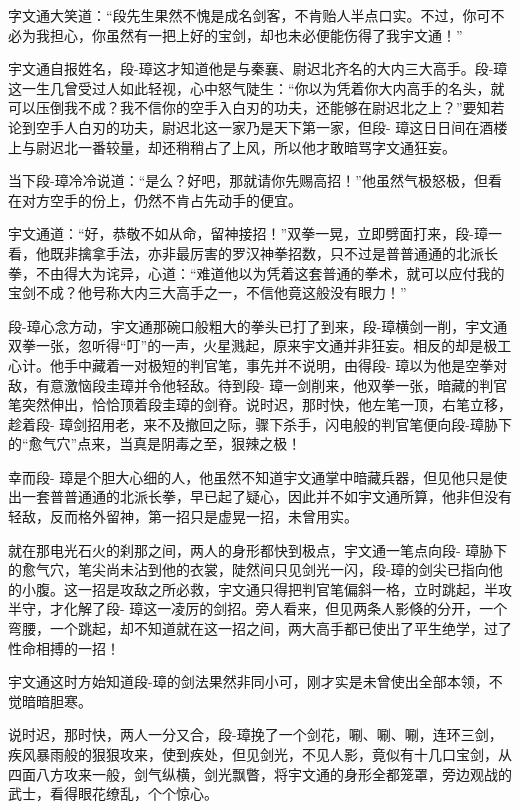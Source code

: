 \documentclass[12pt,oneside]{book}
\begin{document}
字文通大笑道：``段先生果然不愧是成名剑客，不肯贻人半点口实。不过，你可不必为我担心，你虽然有一把上好的宝剑，却也未必便能伤得了我宇文通！''

宇文通自报姓名，段-璋这才知道他是与秦襄、尉迟北齐名的大内三大高手。段-璋这一生几曾受过人如此轻视，心中怒气陡生：``你以为凭着你大内高手的名头，就可以压倒我不成？我不信你的空手入白刃的功夫，还能够在尉迟北之上？''要知若论到空手人白刃的功夫，尉迟北这一家乃是天下第一家，但段-
璋这日日间在酒楼上与尉迟北一番较量，却还稍稍占了上风，所以他才敢暗骂字文通狂妄。

当下段-璋冷冷说道：``是么？好吧，那就请你先赐高招！''他虽然气极怒极，但看在对方空手的份上，仍然不肯占先动手的便宜。

宇文通道：``好，恭敬不如从命，留神接招！''双拳一晃，立即劈面打来，段-璋一看，他既非擒拿手法，亦非最厉害的罗汉神拳招数，只不过是普普通通的北派长拳，不由得大为诧异，心道：``难道他以为凭着这套普通的拳术，就可以应付我的宝剑不成？他号称大内三大高手之一，不信他竟这般没有眼力！''

段-璋心念方动，宇文通那碗口般粗大的拳头已打了到来，段-璋横剑一削，宇文通双拳一张，忽听得``叮''的一声，火星溅起，原来宇文通并非狂妄。相反的却是极工心计。他手中藏着一对极短的判官笔，事先并不说明，由得段-
璋以为他是空拳对敌，有意激恼段圭璋并令他轻敌。待到段-
璋一剑削来，他双拳一张，暗藏的判官笔突然伸出，恰恰顶着段圭璋的剑脊。说时迟，那时快，他左笔一顶，右笔立移，趁着段-
璋剑招用老，来不及撤回之际，骤下杀手，闪电般的判官笔便向段-璋胁下的``愈气穴''点来，当真是阴毒之至，狠辣之极！

幸而段-
璋是个胆大心细的人，他虽然不知道宇文通掌中暗藏兵器，但见他只是使出一套普普通通的北派长拳，早已起了疑心，因此并不如宇文通所算，他非但没有轻敌，反而格外留神，第一招只是虚晃一招，未曾用实。

就在那电光石火的刹那之间，两人的身形都快到极点，宇文通一笔点向段-
璋胁下的愈气穴，笔尖尚未沾到他的衣裳，陡然间只见剑光一闪，段-璋的剑尖已指向他的小腹。这一招是攻敌之所必救，宇文通只得把判官笔偏斜一格，立时跳起，半攻半守，才化解了段-
璋这一凌厉的剑招。旁人看来，但见两条人影倏的分开，一个弯腰，一个跳起，却不知道就在这一招之间，两大高手都已使出了平生绝学，过了性命相搏的一招！

宇文通这时方始知道段-璋的剑法果然非同小可，刚才实是未曾使出全部本领，不觉暗暗胆寒。

说时迟，那时快，两人一分又合，段-璋挽了一个剑花，唰、唰、唰，连环三剑，疾风暴雨般的狠狠攻来，使到疾处，但见剑光，不见人影，竟似有十几口宝剑，从四面八方攻来一般，剑气纵横，剑光飘瞥，将宇文通的身形全都笼罩，旁边观战的武士，看得眼花缭乱，个个惊心。
\end{document}
